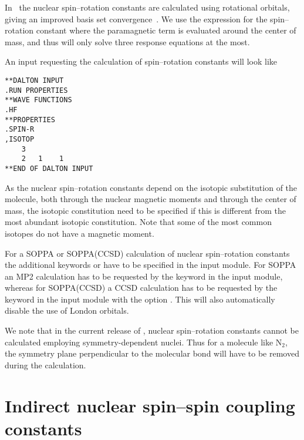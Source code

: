 In \dalton\ the nuclear spin--rotation
constants are calculated using
rotational orbitals, giving an improved
basis set convergence~\cite{jgkrthjcp105}. We use the
expression for the spin--rotation constant where the paramagnetic term
is evaluated around the center of mass, and thus will only solve three
response equations at the most.

An input requesting the calculation of spin--rotation constants will
look like

\begin{verbatim}
**DALTON INPUT
.RUN PROPERTIES
**WAVE FUNCTIONS
.HF
**PROPERTIES
.SPIN-R
,ISOTOP
    3
    2   1    1
**END OF DALTON INPUT
\end{verbatim}

As the nuclear spin--rotation constants
depend on the isotopic substitution of
the molecule, both through the nuclear magnetic moments and through the
center of mass, the isotopic constitution need to be specified if this
is different  from the most abundant isotopic constitution. Note that
some of the most common isotopes do not have a magnetic moment.

For a SOPPA or SOPPA(CCSD) calculation of
nuclear spin--rotation constants the additional keywords  or
 have to be specified in the  input
module. For SOPPA an MP2 calculation has to be requested by the keyword
 in the  input module, whereas for SOPPA(CCSD) a
CCSD calculation has to be requested by the keyword  in the  input module with the  option
. This will also automatically disable the use of London
orbitals.

We note that in the current release of \dalton, nuclear spin--rotation
constants cannot be calculated employing symmetry-dependent
nuclei. Thus for a molecule like N$_2$, the symmetry plane
perpendicular to the molecular bond will have to be removed during the
calculation.

\section{Indirect nuclear spin--spin coupling
constants}\label{sec:spinspin}

